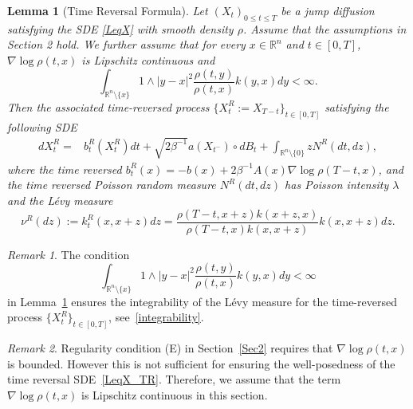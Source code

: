 \documentclass[10pt]{article}
\newtheorem{lem}[thm]{Lemma}
\theoremstyle{definition}
\theoremstyle{remark}
\newtheorem{rem}{Remark}[section]
\numberwithin{equation}{section}
\newcommand{\lam}{\lambda}
\begin{document}
\begin{lem}[Time Reversal Formula]\label{TRformula}
Let $(X_t)_{0 \leq t \leq T}$  be a jump diffusion satisfying the SDE \eqref{LeqX} with smooth density $\rho$. Assume that the assumptions in Section 2 hold.
{We further assume that for every $x \in \mathbb{R}^n$ and $t \in [0,T]$, $\nabla\log\rho(t,x)$ is Lipschitz continuous and
\begin{equation*}
    \int_{\mathbb{R}^n \setminus\{x\}} 1 \wedge |y-x|^2 \frac{\rho(t,y)}{\rho(t,x)} k(y,x) dy < \infty.
\end{equation*}}
Then the associated time-reversed process \( \{ X_t^R := X_{T - t} \}_{t \in [0, T]} \)  satisfying the following SDE
\begin{align}\label{LeqX_TR}
 dX^R_t = & b^{R}_t(X^R_{t})dt + \sqrt{2\beta^{-1}} a(X_{t^-}) \circ dB_t  +  \int_{\mathbb{R}^n\setminus\{0\}} z N^R(dt,dz) ,
\end{align}
where the time reversed $b^{R}_t(x) = -b(x) + 2\beta^{-1}A(x)\nabla\log\rho(T-t,x)$, and the time reversed Poisson random measure $N^R(dt,dz)$ has Poisson intensity $\lam$ and the L\'{e}vy measure 
\begin{equation*}
    \nu^R(dz) :=k^{R}_t(x,x+z)dz = \frac{\rho(T-t,x+z)k(x+z,x)}{\rho(T-t,x)k(x,x+z)}k(x,x+z)dz.
\end{equation*}
\end{lem}
\begin{rem}\label{rmk:integrability}
    The condition 
    \begin{equation*}
    \int_{\mathbb{R}^n \setminus\{x\}} 1 \wedge |y-x|^2 \frac{\rho(t,y)}{\rho(t,x)} k(y,x) dy < \infty
\end{equation*}
in Lemma~\ref{TRformula} ensures the integrability of the L\'evy measure for the time-reversed process \( \{ X_t^R \}_{t \in [0, T]} \), see~\eqref{integrability}.
\end{rem}
\begin{rem}
     Regularity condition (E) in Section~\ref{Sec2} requires that $\nabla\log\rho(t,x)$ is bounded. However this is not sufficient for ensuring the well-posedness of the time reversal SDE~\eqref{LeqX_TR}. Therefore, we assume that the term $\nabla\log\rho(t,x)$ is Lipschitz continuous in this section. 
\end{rem}
\end{document}
